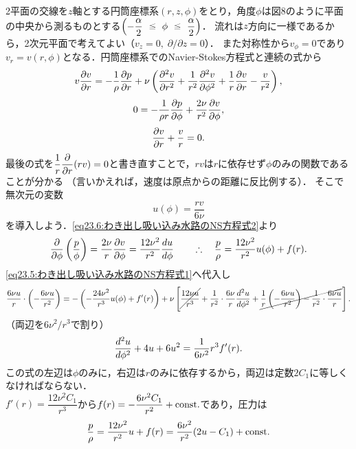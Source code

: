 2平面の交線を$z$軸とする円筒座標系$(r, z, \phi)$をとり，角度$\phi$は図8のように平面の中央から測るものとする$\left( -\dfrac{\alpha}{2} \ika \phi \ika \dfrac{\alpha}{2} \right)$．
流れは$z$方向に一様であるから，2次元平面で考えてよい（$v_z=0, \; \partial/\partial z = 0$）．
また対称性から$v_\phi=0$であり$v_r = v(r, \phi)$となる．円筒座標系でのNavier-Stokes方程式と連続の式から
\begin{equation}\label{eq23.5:わき出し吸い込み水路のNS方程式1}
    v\pdv{v}{r} = -\frac{1}{\rho} \pdv{p}{r} + \nu \left( \pdv[2]{v}{r} + \frac{1}{r^2} \pdv[2]{v}{\phi} + \frac{1}{r} \pdv{v}{r} - \frac{v}{r^2} \right) ,
\end{equation}
\begin{equation}\label{eq23.6:わき出し吸い込み水路のNS方程式2}
    0 = - \frac{1}{\rho r} \pdv{p}{\phi} + \frac{2\nu}{r^2} \pdv{v}{\phi} ,
\end{equation}
\[
    \pdv{v}{r} + \frac{v}{r} = 0 .
\]
最後の式を$\dfrac{1}{r}\dpdv{r}(rv)=0$と書き直すことで，$rv$は$r$に依存せず$\phi$のみの関数であることが分かる
（言いかえれば，速度は原点からの距離に反比例する）．
そこで無次元の変数
\begin{equation}
    u(\phi) = \frac{rv}{6\nu}
\end{equation}
を導入しよう．\eqref{eq23.6:わき出し吸い込み水路のNS方程式2}より
\[
    \pdv{\phi} \left( \frac{p}{\phi} \right) = \frac{2\nu}{r} \pdv{v}{\phi} = \frac{12\nu^2}{r^2} \dv{u}{\phi}
    \qquad \therefore\quad
    \frac{p}{\rho} = \frac{12\nu^2}{r^2} u(\phi) + f(r).
\]
\eqref{eq23.5:わき出し吸い込み水路のNS方程式1}へ代入し
\[
    \frac{6\nu u}{r} \cdot \left( -\frac{6\nu u}{r^2} \right)
    = - \left( -\frac{24\nu^2}{r^3} u(\phi) + f'(r) \right)
    + \nu \left[ \cancel{\frac{12\nu u}{r^3}} + \frac{1}{r^2} \cdot \frac{6\nu}{r} \dv[2]{u}{\phi}
    + \cancel{ \frac{1}{r} \left( - \frac{6\nu u}{r^2} \right) - \frac{1}{r^2} \cdot \frac{6\nu u}{r} } \right] .
\]
（両辺を$6\nu^2/r^3$で割り）
\[
    \dv[2]{u}{\phi} + 4u + 6u^2 = \frac{1}{6\nu^2} r^3 f'(r) .
\]
この式の左辺は$\phi$のみに，右辺は$r$のみに依存するから，両辺は定数$2C_1$に等しくなければならない．\\
$f'(r) = \dfrac{12\nu^2 C_1}{r^3}$から$f(r) = - \dfrac{6\nu^2C_1}{r^2} + \mathrm{const.}$であり，圧力は
\begin{equation}
    \frac{p}{\rho} = \frac{12\nu^2}{r^2}u + f(r)
    = \frac{6\nu^2}{r^2} (2u-C_1) +\mathrm{const.}
\end{equation}

